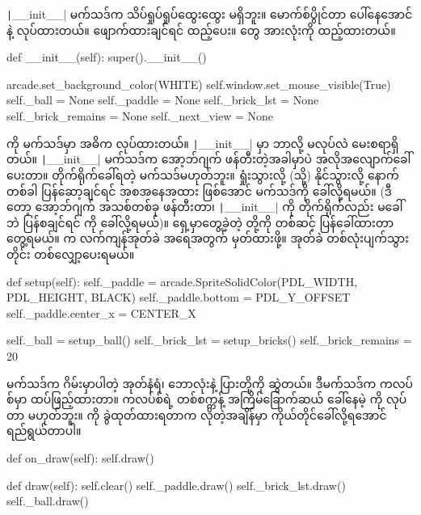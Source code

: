 \texttt|__init__| မက်သဒ်က သိပ်ရှုပ်ရှုပ်ထွေးထွေး မရှိဘူး။ မောက်စ်ပွိုင်တာ ပေါ်နေအောင်   နဲ့ လုပ်ထားတယ်။ ဖျောက်ထားချင်ရင်  ထည့်ပေး။  တွေ အားလုံးကို  ထည့်ထားတယ်။
%
\begin{py}
def __init__(self):
    super().__init__()

    arcade.set_background_color(WHITE)
    self.window.set_mouse_visible(True)
    self._ball = None
    self._paddle = None
    self._brick_lst = None
    self._brick_remains = None
    self._next_view = None
\end{py}
%

 ကို  မက်သဒ်မှာ အဓိက လုပ်ထားတယ်။ \texttt|__init__| မှာ ဘာလို့ မလုပ်လဲ မေးစရာရှိတယ်။ \texttt|__init__| မက်သဒ်က အော့ဘ်ဂျက် ဖန်တီးတဲ့အခါမှာပဲ အလိုအလျောက်ခေါ်ပေးတာ။ တိုက်ရိုက်ခေါ်ရတဲ့ မက်သဒ်မဟုတ်ဘူး။ ရှုံးသွားလို့ (သို့) နိုင်သွားလို့ နောက်တစ်ခါ ပြန်ဆော့ချင်ရင် အစအနေအထား ဖြစ်အောင်  မက်သဒ်ကို ခေါ်လို့ရမယ်။ (ဒီတော့  အော့ဘ်ဂျက် အသစ်တစ်ခု ဖန်တီးတာ၊ \texttt|__init__| ကို တိုက်ရိုက်လည်း မခေါ်ဘဲ ပြန်စချင်ရင်  ကို ခေါ်လို့ရမယ်)။ ရှေ့မှာတွေ့ခဲ့တဲ့ \fEn{,} \fEn{,}  တို့ကို တစ်ဆင့် ပြန်ခေါ်ထားတာ တွေ့ရမယ်။  က လက်ကျန်အုတ်ခဲ အရေအတွက် မှတ်ထားဖို့။ အုတ်ခဲ တစ်လုံးပျက်သွားတိုင်း တစ်လျှော့ပေးရမယ်။

%
\begin{py}
def setup(self):
    self._paddle = arcade.SpriteSolidColor(PDL_WIDTH,
                                            PDL_HEIGHT,
                                            BLACK)
    self._paddle.bottom = PDL_Y_OFFSET
    self._paddle.center_x = CENTER_X

    self._ball = setup_ball()
    self._brick_lst = setup_bricks()
    self._brick_remains = 20
\end{py}
%

 မက်သဒ်က ဂိမ်းမှာပါတဲ့ အုတ်နံရံ၊ ဘောလုံးနဲ့  ပြားတို့ကို ဆွဲတယ်။ ဒီမက်သဒ်က  ကလပ်စ်မှာ ထပ်ဖြည့်ထားတာ။  ကလပ်စ်ရဲ့ တစ်စက္ကန့် အကြိမ်ခြောက်ဆယ် ခေါ်နေမဲ့   ကို  လုပ်တာ မဟုတ်ဘူး။  ကို ခွဲထုတ်ထားရတာက လိုတဲ့အချိန်မှာ ကိုယ်တိုင်ခေါ်လို့ရအောင် ရည်ရွယ်တာပါ။ 
%
\begin{py}
def on_draw(self):
    self.draw()

def draw(self):
    self.clear()
    self._paddle.draw()
    self._brick_lst.draw()
    self._ball.draw()
\end{py}
%

